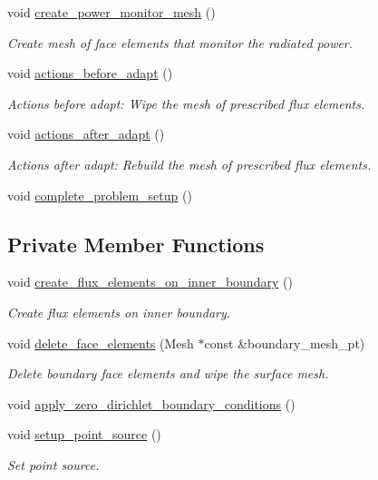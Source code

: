 \begin{DoxyCompactItemize}
void \hyperlink{classPMLFourierDecomposedHelmholtzProblem_a83e0aa333ec3b25f1afccc3bc0a529ad}{create\+\_\+power\+\_\+monitor\+\_\+mesh} ()
\begin{DoxyCompactList}\small\item\em Create mesh of face elements that monitor the radiated power. \end{DoxyCompactList}\item 
void \hyperlink{classPMLFourierDecomposedHelmholtzProblem_ae4b1cacec10553bdb6781b65ed73abce}{actions\+\_\+before\+\_\+adapt} ()
\begin{DoxyCompactList}\small\item\em Actions before adapt\+: Wipe the mesh of prescribed flux elements. \end{DoxyCompactList}\item 
void \hyperlink{classPMLFourierDecomposedHelmholtzProblem_ad19bce2b8cb30bdeffd656fdc4014c0c}{actions\+\_\+after\+\_\+adapt} ()
\begin{DoxyCompactList}\small\item\em Actions after adapt\+: Rebuild the mesh of prescribed flux elements. \end{DoxyCompactList}\item 
void \hyperlink{classPMLFourierDecomposedHelmholtzProblem_aca49343d9672607fdc3ab5f6ed4e9d24}{complete\+\_\+problem\+\_\+setup} ()
\end{DoxyCompactItemize}
\subsection*{Private Member Functions}
\begin{DoxyCompactItemize}
\item 
void \hyperlink{classPMLFourierDecomposedHelmholtzProblem_afd6e3401bdbd1d3deb3271553fbe1d3a}{create\+\_\+flux\+\_\+elements\+\_\+on\+\_\+inner\+\_\+boundary} ()
\begin{DoxyCompactList}\small\item\em Create flux elements on inner boundary. \end{DoxyCompactList}\item 
void \hyperlink{classPMLFourierDecomposedHelmholtzProblem_a4a9b767ba4beb7ab5db9c98fc46c49b2}{delete\+\_\+face\+\_\+elements} (Mesh $\ast$const \&boundary\+\_\+mesh\+\_\+pt)
\begin{DoxyCompactList}\small\item\em Delete boundary face elements and wipe the surface mesh. \end{DoxyCompactList}\item 
void \hyperlink{classPMLFourierDecomposedHelmholtzProblem_ad7680c25a32087cb6da96d4bcedf1b23}{apply\+\_\+zero\+\_\+dirichlet\+\_\+boundary\+\_\+conditions} ()
\item 
void \hyperlink{classPMLFourierDecomposedHelmholtzProblem_a7d416452acc602776de2072a7c0e1249}{setup\+\_\+point\+\_\+source} ()
\begin{DoxyCompactList}\small\item\em Set point source. \end{DoxyCompactList}\end{DoxyCompactItemize}
